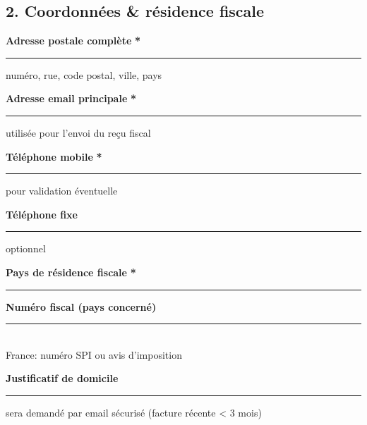 \documentclass[12pt, a4paper]{article}
\newcommand{\required}{\textcolor{redalert}{\textbf{*}}}
\newcommand{\formfield}[2][]{%
    \par\noindent
    \begin{minipage}[t]{0.3\textwidth}
        \textbf{#2} \required
    \end{minipage}%
    \begin{minipage}[t]{0.68\textwidth}
        \rule{\linewidth}{0.4pt}%
        \ifblank{#1}{}{%
            \vspace{0.1cm}\newline
            {\tiny \textcolor{ethicGreenLight}{#1}}%
        }%
    \end{minipage}%
    \par\vspace{0.2cm}%
}
\newcommand{\formfieldOpt}[2][]{%
    \par\noindent
    \begin{minipage}[t]{0.3\textwidth}
        \textbf{#2}
    \end{minipage}%
    \begin{minipage}[t]{0.68\textwidth}
        \rule{\linewidth}{0.4pt}%
        \ifblank{#1}{}{%
            \vspace{0.1cm}\newline
            {\tiny \textcolor{ethicGreenLight}{#1}}%
        }%
    \end{minipage}%
    \par\vspace{0.2cm}%
}
\begin{document}
\vspace{0.5cm}

\begin{sectionbox}
    \subsection*{2.  Coordonnées \& résidence fiscale}
    
    \formfield{Adresse postale complète}{numéro, rue, code postal, ville, pays}
    \formfield{Adresse email principale}{utilisée pour l'envoi du reçu fiscal}
    \formfield{Téléphone mobile}{pour validation éventuelle}
    \formfieldOpt{Téléphone fixe}{optionnel}
    
    \vspace{0.3cm}
    \noindent
    \begin{minipage}[t]{0.48\textwidth}
        \textbf{Pays de résidence fiscale} \required \\
        \rule{\linewidth}{0.4pt}
    \end{minipage}%
    \hfill
    \begin{minipage}[t]{0.48\textwidth}
        \textbf{Numéro fiscal (pays concerné)} \\
        \rule{\linewidth}{0.4pt} \\
        {\tiny \textcolor{ethicGreenLight}{France: numéro SPI ou avis d'imposition}}
    \end{minipage}
    
    \formfieldOpt{Justificatif de domicile}{sera demandé par email sécurisé (facture récente < 3 mois)}
\end{sectionbox}

\vspace{0.5cm}
\end{document}
